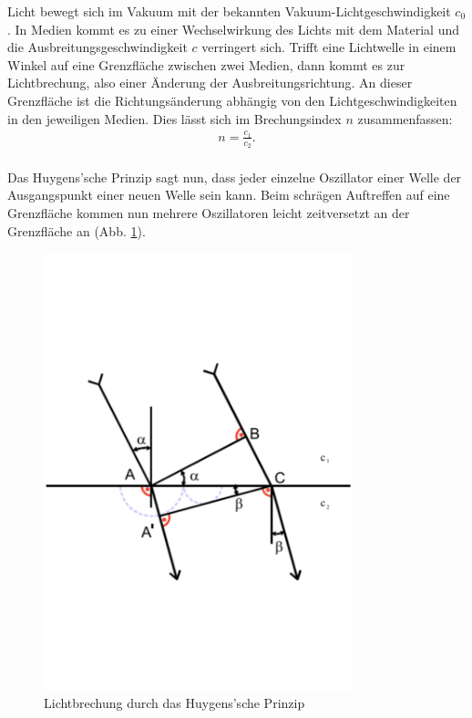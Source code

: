 Licht bewegt sich im Vakuum mit der bekannten Vakuum-Lichtgeschwindigkeit $c_{\text{0}}$.
In Medien kommt es zu einer Wechselwirkung des Lichts mit dem Material und die Ausbreitungsgeschwindigkeit $c$ verringert sich.
Trifft eine Lichtwelle in einem Winkel auf eine Grenzfläche zwischen zwei Medien, dann kommt es zur Lichtbrechung, also einer Änderung der Ausbreitungsrichtung.
An dieser Grenzfläche ist die Richtungsänderung abhängig von den Lichtgeschwindigkeiten in den jeweiligen Medien.
Dies lässt sich im Brechungsindex $n$ zusammenfassen:
\begin{align}
   n=\frac{c_{\text{1}}}{c_{\text{2}}}.
   \label{eqn:brechung}
\end{align}
\\Das Huygens'sche Prinzip sagt nun, dass jeder einzelne Oszillator einer Welle der Ausgangspunkt einer neuen Welle sein kann.
Beim schrägen Auftreffen auf eine Grenzfläche kommen nun mehrere Oszillatoren leicht zeitversetzt an der Grenzfläche an (Abb. \ref{fig:huygens}).
\begin{figure}[h!]
  \centering
  \includegraphics[width=0.8\textwidth]{huygens.pdf}
  \caption{Lichtbrechung durch das Huygens'sche Prinzip \cite{1}}
  \label{fig:huygens}
\end{figure}
